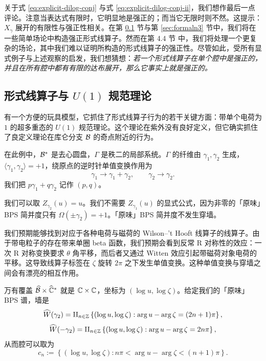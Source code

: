 关于式 \eqref{eq:explicit-dilog-conj} 与式 \eqref{eq:explicit-dilog-conj-ii}，我们想作最后一点评论。注意当表达式有限时，它明显地是强正的；而当它无限时则不然。这提示：$X_\gamma$ 展开的有限性与强正性相关。在第 \ref{subsec:Formal-line-ops-U1} 节与第 \ref{sec:formaln3} 节中，我们将在一些简单场论中构造强正形式线算子。然而在第 4.4 节%
中，我们将处理一个更复杂的场论，其中我们难以证明所构造的形式线算子的强正性。尽管如此，受所有显式例子与上述观察的启发，我们想猜想：\emph{若一个形式线算子在单个腔中是强正的，并且在所有腔中都有有限的达布展开，那么它事实上就是强正的。}

\subsection{形式线算子与 $U(1)$ 规范理论}\label{subsec:Formal-line-ops-U1}

有一个方便的玩具模型，它抓住了形式线算子行为的若干关键方面：带单个电荷为 $1$ 的超多重态的 $U(1)$ 规范理论。这个理论在紫外没有良好定义，但它确实抓住了良定义理论在库仑分支 $\mathcal{B}$ 的奇点附近的行为。

在此例中，$\mathcal{B}^*$ 是去心圆盘，$\Gamma$ 是秩二的局部系统。$\Gamma$ 的纤维由 $\gamma_1,\gamma_2$ 生成，$\langle\gamma_1,\gamma_2\rangle = +1$，绕原点的逆时针单值变换作用为
\begin{equation}
\gamma_1 \to \gamma_1+\gamma_2, \qquad \gamma_2 \to \gamma_2.
\end{equation}
我们把 $p\gamma_1+q\gamma_2$ 记作 $(p,q)$。

我们可以取 $Z_{\gamma_2}(u)=u$。我们不需要 $Z_{\gamma_1}(u)$ 的显式公式，因为非零的「原味」BPS 简并度只有 $\Omega(\pm\gamma_2)=+1$。「原味」BPS 简并度不发生穿墙。

我们预期能够找到对应于各种电荷与磁荷的 Wilson--'t Hooft 线算子的线算子。由于带电粒子的存在带来单圈 beta 函数，我们预期会看到反常 R 对称性的效应：一次 R 对称变换要求 $\theta$ 角平移，而后者又通过 Witten 效应引起带磁荷对象电荷的平移。这导致线算子标签在 $\zeta$ 旋转 $2\pi$ 之下发生单值变换。这种单值变换与穿墙之间会有漂亮的相互作用。

万有覆盖 $\widehat{\mathcal{B}} \times \widehat{\mathbb{C}}^*$ 就是 $\mathbb{C}\times\mathbb{C}$，坐标为 $(\log u,\log\zeta)$。给定我们的「原味」BPS 谱，墙是
\begin{equation}
\widehat W(\gamma_2) = \amalg_{n\in\mathbb{Z}}\left\{(\log u,\log\zeta): \arg u-\arg\zeta = (2n+1)\pi\right\},
\end{equation}
\begin{equation}
\widehat W(-\gamma_2) = \amalg_{n\in\mathbb{Z}}\left\{(\log u,\log\zeta): \arg u-\arg\zeta = 2n\pi\right\},
\end{equation}
从而腔可以取为
\begin{equation}
c_n := \left\{(\log u,\log\zeta): n\pi < \arg u-\arg\zeta < (n+1)\pi\right\}.
\end{equation}


